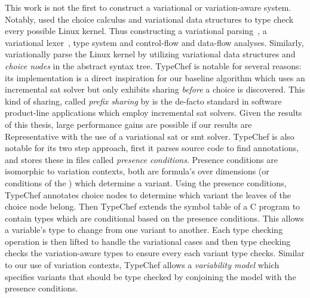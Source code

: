 This work is not the first to construct a variational or variation-aware system.
Notably, \citet{KKHL:FOSD10} used the choice calculus and variational data
structures to type check every possible Linux kernel. Thus constructing a
variational parsing~\cite{KGR+:OOPSLA11}, a variational
lexer~\cite{Kastner11partialpreprocessing}, type
system\cite{LKA+:ESECFSE13,KOE:OOPSLA12} and control-flow and data-flow
analyses\cite{LKA+:ESECFSE13}. Similarly, \citet{GG:PLDI12} variationally parse
the Linux kernel by utilizing variational data structures and \emph{choice
  nodes} in the abstract syntax tree. TypeChef is notable for several reasons:
its implementation is a direct inspiration for our baseline algorithm \vTop{}
which uses an incremental \ac{sat} solver but only exhibits sharing
\emph{before} a choice is discovered. This kind of sharing, called \emph{prefix
  sharing} by \citet{SE17fosd} is the de-facto standard in software product-line
applications which employ incremental \ac{sat} solvers. Given the results of
this thesis, large performance gains are possible if our results are
Representative with the use of a variational \ac{sat} or \ac{smt} solver.
TypeChef is also notable for its two step approach, first it parses source code
to find  annotations, and stores these in files called
\emph{presence conditions}. Presence conditions are isomorphic to variation
contexts, both are \pl{} formula's over dimensions (or conditions of the
) which determine a variant. Using the presence conditions, TypeChef
annotates choice nodes to determine which variant the leaves of the choice node
belong. Then TypeChef extends the symbol table of a C program to contain types
which are conditional based on the presence conditions. This allows a variable's
type to change from one variant to another. Each type checking operation is then
lifted to handle the variational cases and then type checking checks the
variation-aware types to ensure every each variant type checks. Similar to our
use of variation contexts, TypeChef allows a \emph{variability model} which
specifies variants that should be type checked by conjoining the model with the
presence conditions.

